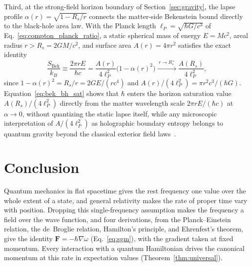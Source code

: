 \documentclass[aps,prd,onecolumn,tightenlines,nofootinbib,notitlepage,11pt,floatfix]{revtex4-2}
\theoremstyle{indentedtheorem}
\begin{document}
Third, at the strong-field horizon boundary of Section~\ref{sec:gravity}, the lapse profile $\alpha(r)=\sqrt{1-R_s/r}$ connects the matter-side Bekenstein bound directly to the black-hole area law. With the Planck length $\ell_P = \sqrt{\hbar G/c^3}$ of Eq.~\eqref{eq:compton_planck_ratio}, a static spherical mass of energy $E=Mc^2$, areal radius $r>R_s=2GM/c^2$, and surface area $A(r)=4\pi r^2$ satisfies the exact identity
\begin{equation}
    \frac{S_\text{Bek}}{k_B} \equiv \frac{2\pi r E}{\hbar c} = \frac{A(r)}{4\ell_P^2}\big(1-\alpha(r)^2\big) \xrightarrow{\;r\to R_s^+\;} \frac{A(R_s)}{4\ell_P^2} ,
    \label{eq:bek_bh_sat}
\end{equation}
since $1-\alpha(r)^2 = R_s/r = 2GE/(rc^4)$ and $A(r)/(4\ell_P^2) = \pi r^2 c^3/(\hbar G)$. Equation~\eqref{eq:bek_bh_sat} shows that $\hbar$ enters the horizon saturation value $A(R_s)/(4\ell_P^2)$ directly from the matter wavelength scale $2\pi r E/(\hbar c)$ at $\alpha\to 0$, without quantizing the static lapse itself, while any microscopic interpretation of $A/(4\ell_P^2)$ as holographic boundary entropy belongs to quantum gravity beyond the classical exterior field laws~\citep{Bousso2002,Marolf2009}.

\section{Conclusion}
\label{sec:conclusion}

Quantum mechanics in flat spacetime gives the rest frequency one value over the whole extent of a state, and general relativity makes the rate of proper time vary with position. Dropping this single-frequency assumption makes the frequency a field over the wave function, and four derivations, from the Planck--Einstein relation, the de~Broglie relation, Hamilton's principle, and Ehrenfest's theorem, give the identity $\mathbf{F}=-\hbar\nabla\omega$ (Eq.~\eqref{eq:sgm}), with the gradient taken at fixed momentum. Every interaction with a quantum Hamiltonian drives the canonical momentum at this rate in expectation values (Theorem~\ref{thm:universal}).
\end{document}
